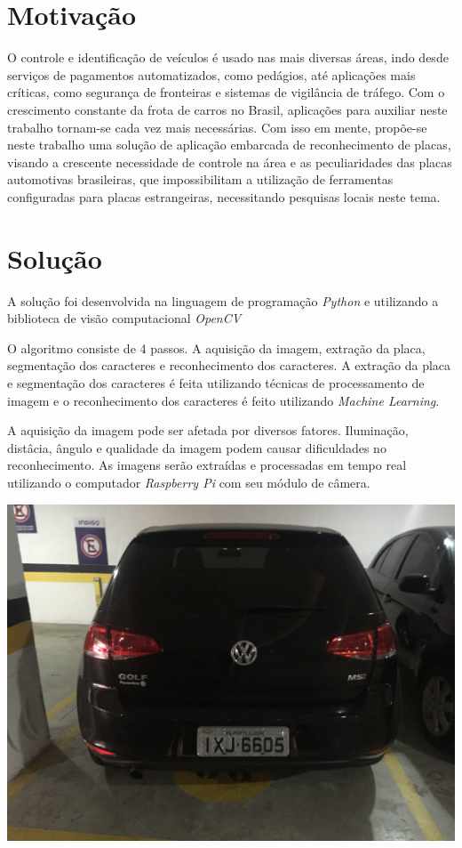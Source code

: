 \documentclass[a0,portrait]{a0poster}
\begin{document}
\begin{multicols}{2}

\color{NavyBlue}
\section*{\huge Motivação}
\color{Black}
\Large
\justifying

O controle e identificação de veículos é usado nas mais diversas áreas, indo
desde serviços de pagamentos automatizados, como pedágios, até aplicações
mais críticas, como segurança de fronteiras e sistemas de vigilância de
tráfego. Com o crescimento constante da frota de carros no Brasil,
aplicações para auxiliar neste trabalho tornam-se cada vez mais necessárias.
Com isso em mente, propõe-se neste trabalho uma solução de aplicação
embarcada de reconhecimento de placas, visando a crescente necessidade de
controle na área e as peculiaridades das placas automotivas brasileiras, que
impossibilitam a utilização de ferramentas configuradas para placas
estrangeiras, necessitando pesquisas locais neste tema.

\color{NavyBlue}
\section*{\huge Solução}
\color{Black}

A solução foi desenvolvida na linguagem de programação \emph{Python} e utilizando
a biblioteca de visão computacional \emph{OpenCV}

O algoritmo consiste de 4 passos. A aquisição da imagem, extração da 
placa, segmentação dos caracteres e reconhecimento dos caracteres.
A extração da placa e segmentação dos caracteres é feita utilizando técnicas de
processamento de imagem e o reconhecimento dos caracteres é feito utilizando
\emph{Machine Learning}.

A aquisição da imagem pode ser afetada por diversos fatores. Iluminação, distâcia,
ângulo e qualidade da imagem podem causar dificuldades no reconhecimento. As imagens
serão extraídas e processadas em tempo real utilizando o computador \emph{Raspberry Pi}
com seu módulo de câmera.

\begin{center}
	\includegraphics[width=0.70\linewidth]{../../input/full_car.JPG}
	\label{fig:input_image}
\end{center}


\end{multicols}
\end{document}
